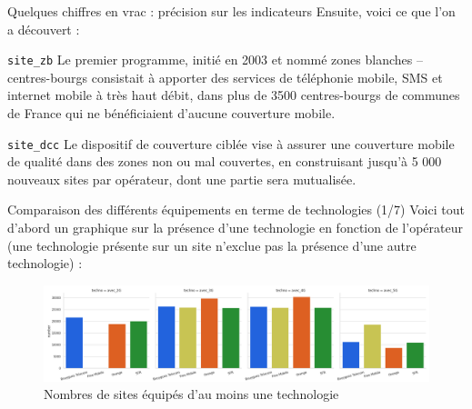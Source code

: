 \begin{frame}{Quelques chiffres en vrac : précision sur les indicateurs}
    Ensuite, voici ce que l'on a découvert :
    \begin{block}{\texttt{site\_zb}}
        Le premier programme, initié en 2003 et nommé \og zones blanches – centres-bourgs\fg{} consistait à apporter des services de téléphonie mobile, SMS et internet mobile à très haut débit, dans plus de 3500 centres-bourgs de communes de France qui ne bénéficiaient d’aucune couverture mobile.
        \footnotemark[1]
    \end{block}

    \begin{block}{\texttt{site\_dcc}}
        Le dispositif de couverture ciblée vise à assurer une couverture mobile de qualité dans des zones non ou mal couvertes, en construisant jusqu’à 5 000 nouveaux sites par opérateur, dont une partie sera mutualisée.
        \footnotemark[2]
    \end{block}
    
\end{frame}



\begin{frame}{Comparaison des différents équipements en terme de technologies (1/7)}
    Voici tout d'abord un graphique sur la présence d'une technologie en fonction de l'opérateur (une technologie présente sur un site n'exclue pas la présence d'une autre technologie) :
    \begin{figure}
        \includegraphics[height=0.4\paperheight]{images/barplots/avec_techno.png}
        \caption{\label{fig:av_tech}Nombres de sites équipés d'au moins une technologie}
    \end{figure}
\end{frame}

